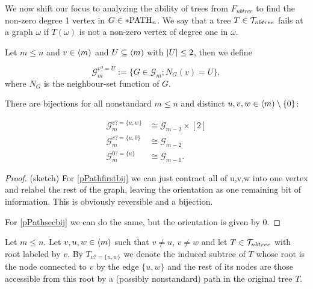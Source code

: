 We now shift our focus to analyzing the ability of trees from $F_{nbtree}$ to find the non-zero degree 1 vertex in $G\in *\text{PATH}_n$. We say that a tree $T\in \mathcal{T}_{nbtree}$ fails at a graph $\omega$ if $T(\omega)$ is not a non-zero vertex of degree one in $\omega$.

\begin{defi}
Let $m\leq n$ and $v\in \langle m)$ and $U\subseteq \langle m)$ with $\left|{U}\right|\leq 2$, then we define 

\[\mathcal{G}_m^{v?=U}:=\{G\in\mathcal{G}_m;N_G(v)=U\},\]
where $N_G$ is the neighbour-set function of $G$.
\end{defi}
\begin{lemm}
There are bijections for all nonstandard $m\leq n$ and distinct $u,v,w\in \langle m)\setminus\{0\}$:

\begin{align}
\mathcal{G}_m^{v?=\{u,w\}}&\cong\mathcal{G}_{m-2}\times [2] \label{pPathfirstbij}\\
\mathcal{G}_m^{v?=\{u,0\}}&\cong\mathcal{G}_{m-2}\label{pPathsecbij}\\
\mathcal{G}_m^{0?=\{u\}}&\cong\mathcal{G}_{m-1}\label{pPaththrdbij}.
\end{align}
\end{lemm}
\begin{proof} (sketch)
For \eqref{pPathfirstbij} we can just contract all of {u,v,w} into one vertex and relabel the rest of the graph, leaving the orientation as one remaining bit of information. This is obviously reversible and a bijection.

For \eqref{pPathsecbij} we can do the same, but the orientation is given by $0$.
\end{proof}

\begin{defi}
Let $m\leq n$. Let $v,u,w\in\langle m)$ such that $v\neq u$, $v\neq w$ and let $T\in\mathcal{T}_{nbtree}$ with root labeled by $v$. By $T_{v?=\{u,w\}}$ we denote the induced subtree of $T$ whose root is the node connected to $v$ by the edge $\{u,w\}$ and the rest of its nodes are those accessible from this root by a (possibly nonstandard) path in the original tree $T$.
\end{defi}

